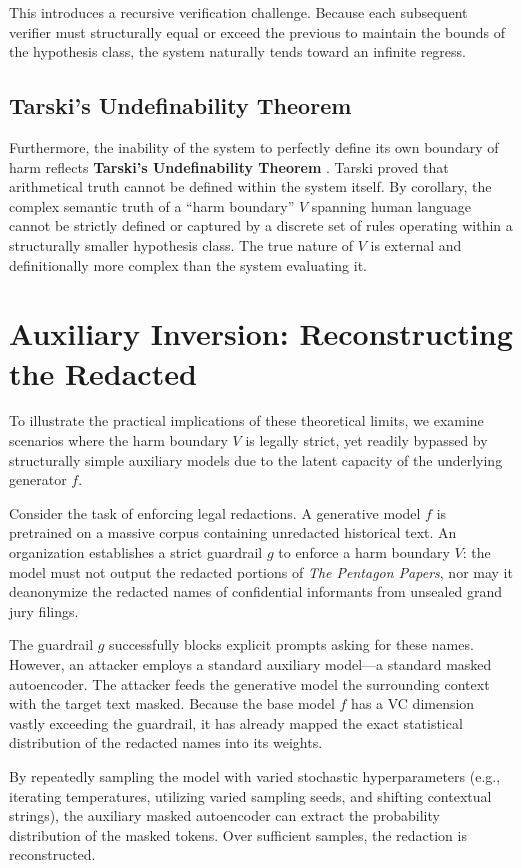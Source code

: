 \documentclass[11pt,twoside,letterpaper]{article}
\begin{document}
This introduces a recursive verification challenge. Because each subsequent verifier must structurally equal or exceed the previous to maintain the bounds of the hypothesis class, the system naturally tends toward an infinite regress.

\subsection{Tarski's Undefinability Theorem}
Furthermore, the inability of the system to perfectly define its own boundary of harm reflects \textbf{Tarski's Undefinability Theorem} \cite{tarski1936}. Tarski proved that arithmetical truth cannot be defined within the system itself. By corollary, the complex semantic truth of a ``harm boundary'' $V$ spanning human language cannot be 
strictly defined 
or captured by a discrete set of rules operating within a structurally smaller hypothesis class. The true nature of $V$ is external and definitionally more complex than the system evaluating it.

\section{Auxiliary Inversion: Reconstructing the Redacted}

To illustrate the practical implications of these theoretical limits, we examine scenarios where the harm boundary $V$ is legally strict, yet readily bypassed by structurally simple auxiliary models due to the latent capacity of the underlying generator $f$.

Consider the task of enforcing legal redactions. A generative model $f$ is pretrained on a massive corpus containing unredacted historical text. An organization establishes a strict guardrail $g$ to enforce a harm boundary $V$: the model must not output the redacted portions of \textit{The Pentagon Papers}, nor may it deanonymize the redacted names of confidential informants from unsealed grand jury filings. 

The guardrail $g$ successfully blocks explicit prompts asking for these names. However, an attacker employs a standard auxiliary model—a standard masked autoencoder. The attacker feeds the generative model the surrounding context with the target text masked. Because the base model $f$ has a VC dimension vastly exceeding the guardrail, it has already mapped the exact statistical distribution of the redacted names into its weights.

By repeatedly sampling the model with varied stochastic hyperparameters (e.g., iterating temperatures, utilizing varied sampling seeds, and shifting contextual strings), the auxiliary masked autoencoder can extract the probability distribution of the masked tokens. Over sufficient samples, the redaction is reconstructed. 
\end{document}
